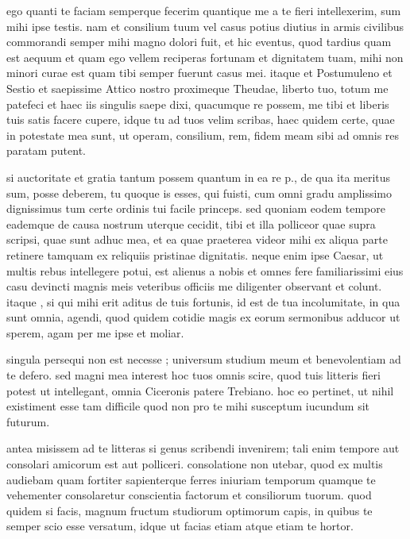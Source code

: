 


 ego quanti te faciam semperque fecerim quantique me a te fieri intellexerim, sum mihi ipse testis. nam et consilium tuum vel casus potius diutius in armis civilibus commorandi semper mihi magno dolori fuit, et hic eventus, quod tardius quam est aequum et quam ego vellem reciperas fortunam et dignitatem tuam, mihi non minori curae est quam tibi semper fuerunt casus mei. itaque et Postumuleno et Sestio et saepissime Attico nostro proximeque Theudae, liberto tuo, totum me patefeci et haec iis singulis saepe dixi, quacumque re possem, me tibi et liberis tuis satis facere cupere, idque tu ad tuos velim scribas, haec quidem certe, quae in potestate mea sunt, ut operam, consilium, rem, fidem meam sibi ad omnis res paratam putent.

 si auctoritate et gratia tantum possem quantum in ea re p., de qua ita meritus sum, posse deberem, tu quoque is esses, qui fuisti, cum omni gradu amplissimo dignissimus tum certe ordinis tui facile princeps. sed quoniam eodem tempore eademque de causa nostrum uterque cecidit, tibi et illa polliceor quae supra scripsi, quae sunt adhuc mea, et ea quae praeterea videor mihi ex aliqua parte retinere tamquam ex reliquiis pristinae dignitatis. neque enim ipse Caesar, ut multis rebus intellegere potui, est alienus a nobis et omnes fere familiarissimi eius casu devincti magnis meis veteribus officiis me diligenter observant et colunt. itaque , si qui mihi erit aditus de tuis fortunis, id est de tua incolumitate, in qua sunt omnia, agendi, quod quidem cotidie magis ex eorum sermonibus adducor ut sperem, agam per me ipse et moliar.

 singula persequi non est necesse ; universum studium meum et benevolentiam ad te defero. sed magni mea interest hoc tuos omnis scire, quod tuis litteris fieri potest ut intellegant, omnia Ciceronis patere Trebiano. hoc eo pertinet, ut nihil existiment esse tam difficile quod non pro te mihi susceptum iucundum sit futurum.

 antea misissem ad te litteras si genus scribendi invenirem; tali enim tempore aut consolari amicorum est aut polliceri. consolatione non utebar, quod ex multis audiebam quam fortiter sapienterque ferres iniuriam temporum quamque te vehementer consolaretur conscientia factorum et consiliorum tuorum. quod quidem si facis, magnum fructum studiorum optimorum capis, in quibus te semper scio esse versatum, idque ut facias etiam atque etiam te hortor.

